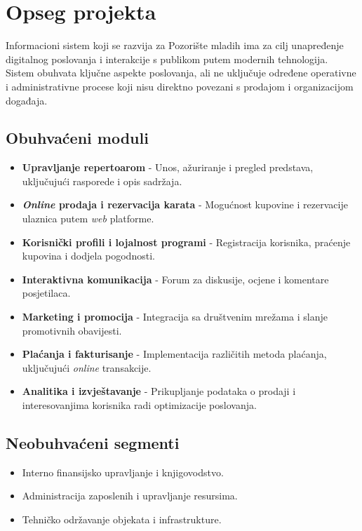 \section{Opseg projekta}

Informacioni sistem koji se razvija za Pozorište mladih ima za cilj unapređenje digitalnog poslovanja i interakcije s publikom putem modernih tehnologija. Sistem obuhvata ključne aspekte poslovanja, ali ne uključuje određene operativne i administrativne procese koji nisu direktno povezani s prodajom i organizacijom događaja.

\subsection{Obuhvaćeni moduli}

\begin{itemize}
\item \textbf{Upravljanje repertoarom} - Unos, ažuriranje i pregled predstava, uključujući rasporede i opis sadržaja.
\item \textbf{\textit{Online} prodaja i rezervacija karata} - Mogućnost kupovine i rezervacije ulaznica putem \textit{web} platforme.
\item \textbf{Korisnički profili i lojalnost programi} - Registracija korisnika, praćenje kupovina i dodjela pogodnosti.
\item \textbf{Interaktivna komunikacija} - Forum za diskusije, ocjene i komentare posjetilaca.
\item \textbf{Marketing i promocija} - Integracija sa društvenim mrežama i slanje promotivnih obavijesti.
\item \textbf{Plaćanja i fakturisanje} - Implementacija različitih metoda plaćanja, uključujući \textit{online} transakcije.
\item \textbf{Analitika i izvještavanje} - Prikupljanje podataka o prodaji i interesovanjima korisnika radi optimizacije poslovanja.
\end{itemize}

\subsection{Neobuhvaćeni segmenti}

\begin{itemize}
\item Interno finansijsko upravljanje i knjigovodstvo.
\item Administracija zaposlenih i upravljanje resursima.
\item Tehničko održavanje objekata i infrastrukture.
\end{itemize}

